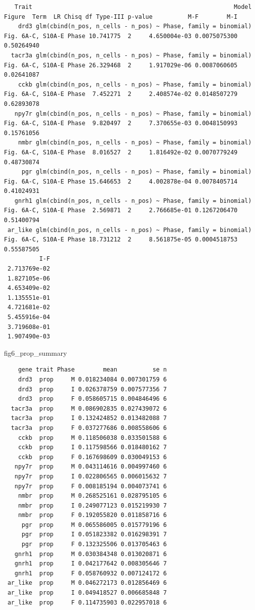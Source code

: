 \documentclass[
  landscape]{article}
\newenvironment{Shaded}{\begin{snugshade}}{\end{snugshade}}
\newcommand{\NormalTok}[1]{#1}
\begin{document}
\begin{verbatim}
   Trait                                                         Model            Figure  Term  LR Chisq df Type-III p-value          M-F        M-I
    drd3 glm(cbind(n_pos, n_cells - n_pos) ~ Phase, family = binomial) Fig. 6A-C, S10A-E Phase 10.741775  2     4.650004e-03 0.0075075300 0.50264940
  tacr3a glm(cbind(n_pos, n_cells - n_pos) ~ Phase, family = binomial) Fig. 6A-C, S10A-E Phase 26.329468  2     1.917029e-06 0.0087060605 0.02641087
    cckb glm(cbind(n_pos, n_cells - n_pos) ~ Phase, family = binomial) Fig. 6A-C, S10A-E Phase  7.452271  2     2.408574e-02 0.0148507279 0.62893078
   npy7r glm(cbind(n_pos, n_cells - n_pos) ~ Phase, family = binomial) Fig. 6A-C, S10A-E Phase  9.820497  2     7.370655e-03 0.0048150993 0.15761056
    nmbr glm(cbind(n_pos, n_cells - n_pos) ~ Phase, family = binomial) Fig. 6A-C, S10A-E Phase  8.016527  2     1.816492e-02 0.0070779249 0.48730874
     pgr glm(cbind(n_pos, n_cells - n_pos) ~ Phase, family = binomial) Fig. 6A-C, S10A-E Phase 15.646653  2     4.002878e-04 0.0078405714 0.41024931
   gnrh1 glm(cbind(n_pos, n_cells - n_pos) ~ Phase, family = binomial) Fig. 6A-C, S10A-E Phase  2.569871  2     2.766685e-01 0.1267206470 0.51400794
 ar_like glm(cbind(n_pos, n_cells - n_pos) ~ Phase, family = binomial) Fig. 6A-C, S10A-E Phase 18.731212  2     8.561875e-05 0.0004518753 0.55587505
          I-F
 2.713769e-02
 1.827105e-06
 4.653409e-02
 1.135551e-01
 4.721681e-02
 5.455916e-04
 3.719608e-01
 1.907490e-03
\end{verbatim}

\begin{Shaded}
\begin{Highlighting}[]
\NormalTok{fig6\_prop\_summary}
\end{Highlighting}
\end{Shaded}

\begin{verbatim}
    gene trait Phase        mean          se n
    drd3  prop     M 0.018234084 0.007301759 6
    drd3  prop     I 0.026378759 0.007577356 7
    drd3  prop     F 0.058605715 0.004846496 6
  tacr3a  prop     M 0.086902835 0.027439072 6
  tacr3a  prop     I 0.132424852 0.013482088 7
  tacr3a  prop     F 0.037277686 0.008558606 6
    cckb  prop     M 0.118506038 0.033501588 6
    cckb  prop     I 0.117598566 0.018480162 7
    cckb  prop     F 0.167698609 0.030049153 6
   npy7r  prop     M 0.043114616 0.004997460 6
   npy7r  prop     I 0.022806565 0.006015632 7
   npy7r  prop     F 0.008185194 0.004073741 6
    nmbr  prop     M 0.268525161 0.028795105 6
    nmbr  prop     I 0.249077123 0.015219930 7
    nmbr  prop     F 0.192055820 0.011858716 6
     pgr  prop     M 0.065586005 0.015779196 6
     pgr  prop     I 0.051823382 0.016298391 7
     pgr  prop     F 0.132325506 0.013705463 6
   gnrh1  prop     M 0.030384348 0.013020871 6
   gnrh1  prop     I 0.042177642 0.008305646 7
   gnrh1  prop     F 0.058760932 0.007124172 6
 ar_like  prop     M 0.046272173 0.012856469 6
 ar_like  prop     I 0.049418527 0.006685848 7
 ar_like  prop     F 0.114735903 0.022957018 6
\end{verbatim}
\end{document}
